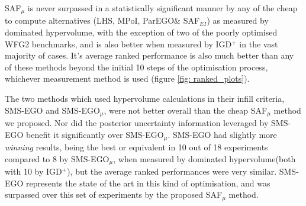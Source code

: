 \documentclass[conference]{IEEEtran}
\newcommand\hpv{dominated hypervolume\xspace}
\newcommand\safmu{SAF$_{\mu}$\xspace}
\newcommand\safei{SAF$_{EI}$\xspace}
\newcommand\smsego{SMS-EGO\xspace}
\newcommand\smsegomu{SMS-EGO$_{\mu}$\xspace}
\newcommand\parego{ParEGO\xspace}
\newcommand\mpoi{MPoI\xspace}
\newcommand\lhs{LHS\xspace}
\newcommand\igd{IGD$^+$\xspace}
\begin{document}
\begin{table}[t]
\begin{subtable}[b]{\columnwidth}
\setlength{\tabcolsep}{2pt}
\smallskip
\end{subtable}
\begin{subtable}[b]{\columnwidth}
\setlength{\tabcolsep}{2pt}
\smallskip
\end{subtable}
\begin{subtable}[b]{\columnwidth}
\setlength{\tabcolsep}{2pt}
\end{subtable}
\caption{The median \igd measured after 150 function evaluations and the associated interquartile ranges (IQR), over 31 repeated optimisations of the WFG test functions. The best median performance is shaded in dark grey, while performances which are statistically equivalent are shaded light grey. }
\label{tab: igd_results}
\end{table}



\safmu is never surpassed in a statistically significant manner by any of the cheap to compute alternatives (\lhs, \mpoi, \parego \& \safei) as measured by \hpv, with the exception of two of the poorly optimised WFG2 benchmarks, and is also better when measured by \igd in the vast majority of cases. It's average ranked performance is also much better than any of these methods beyond the initial 10 steps of the optimisation process, whichever measurement method is used (figure \ref{fig: ranked_plots}).  

The two methods which used hypervolume calculations in their infill criteria, \smsego and \smsegomu, were not better overall than the cheap \safmu method we proposed. Nor did the posterior uncertainty information leveraged by \smsego benefit it significantly over \smsegomu. \smsego had slightly more \textit{winning} results, being the best or equivalent in 10 out of 18 experiments compared to 8 by \smsegomu, when measured by \hpv (both with 10 by \igd), but the average ranked performances were very similar. \smsego represents the state of the art in this kind of optimisation, and was surpassed over this set of experiments by the proposed \safmu method. 
\end{document}
